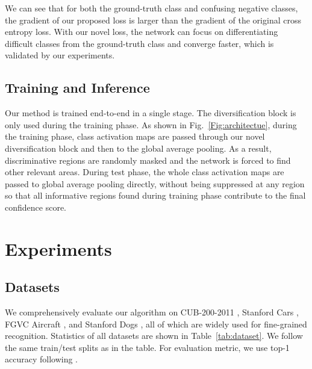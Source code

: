 \documentclass[letterpaper]{article} \usepackage{aaai20}  \usepackage{times}  \usepackage{helvet} \usepackage{courier}  \usepackage[hyphens]{url}  \usepackage{graphicx} \usepackage{multirow}
\begin{document}
We can see that for both the ground-truth class and confusing negative classes, the gradient of our proposed loss is larger than the gradient of the original cross entropy loss. With our novel loss, the network can focus on differentiating difficult classes from the ground-truth class and converge faster, which is validated by our experiments.



\subsection{Training and Inference}
Our method is trained end-to-end in a single stage. The diversification block is only used during the training phase. As shown in Fig.~\ref{Fig:architectue}, during the training phase, class activation maps are passed through our novel diversification block and then to the global average pooling. As a result, discriminative regions are randomly masked and the network is forced to find other relevant areas. During test phase, the whole class activation maps are passed to global average pooling directly, without being suppressed at any region so that all informative regions found during training phase contribute to the final confidence score.

\section{Experiments}
\subsection{Datasets}
We comprehensively evaluate our algorithm on CUB-200-2011 \cite{dataset_cub}, Stanford Cars \cite{dataset_cars}, FGVC Aircraft \cite{dataset_aircraft}, and Stanford Dogs \cite{dataset_dogs}, all of which are widely used for fine-grained recognition. Statistics of all datasets are shown in Table~\ref{tab:dataset}. We follow the same train/test splits as in the table. For evaluation metric, we use top-1 accuracy following \cite{mamc_2018,pc_2018,max_entropy}.
\end{document}
